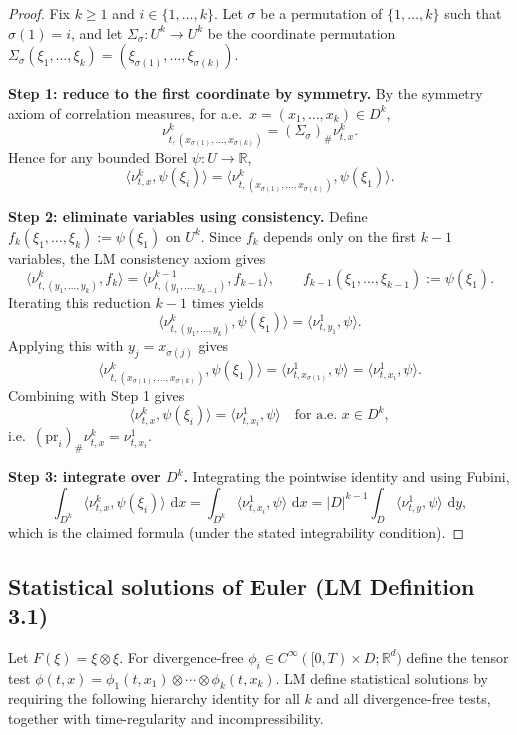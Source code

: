 \documentclass{article}
\numberwithin{equation}{section}
\theoremstyle{plain}
\theoremstyle{definition}
\theoremstyle{remark}
\newcommand{\R}{\mathbb{R}}
\newcommand{\dd}{\,\mathrm{d}}
\begin{document}
\begin{proof}
Fix $k\ge1$ and $i\in\{1,\dots,k\}$. Let $\sigma$ be a permutation of $\{1,\dots,k\}$ such that $\sigma(1)=i$,
and let $\Sigma_\sigma:U^k\to U^k$ be the coordinate permutation
$\Sigma_\sigma(\xi_1,\dots,\xi_k)=(\xi_{\sigma(1)},\dots,\xi_{\sigma(k)})$.

\smallskip
\noindent\textbf{Step 1: reduce to the first coordinate by symmetry.}
By the symmetry axiom of correlation measures, for a.e.\ $x=(x_1,\dots,x_k)\in D^k$,
\[
\nu^k_{t,(x_{\sigma(1)},\dots,x_{\sigma(k)})}=(\Sigma_\sigma)_\#\nu^k_{t,x}.
\]
Hence for any bounded Borel $\psi:U\to\R$,
\[
\langle \nu^k_{t,x},\psi(\xi_i)\rangle
=
\langle \nu^k_{t,(x_{\sigma(1)},\dots,x_{\sigma(k)})},\psi(\xi_1)\rangle.
\]

\smallskip
\noindent\textbf{Step 2: eliminate variables using consistency.}
Define $f_k(\xi_1,\dots,\xi_k):=\psi(\xi_1)$ on $U^k$.
Since $f_k$ depends only on the first $k-1$ variables, the LM consistency axiom gives
\[
\langle \nu^k_{t,(y_1,\dots,y_k)}, f_k\rangle
=
\langle \nu^{k-1}_{t,(y_1,\dots,y_{k-1})}, f_{k-1}\rangle,
\qquad
f_{k-1}(\xi_1,\dots,\xi_{k-1}):=\psi(\xi_1).
\]
Iterating this reduction $k-1$ times yields
\[
\langle \nu^k_{t,(y_1,\dots,y_k)},\psi(\xi_1)\rangle
=
\langle \nu^1_{t,y_1},\psi\rangle.
\]
Applying this with $y_j=x_{\sigma(j)}$ gives
\[
\langle \nu^k_{t,(x_{\sigma(1)},\dots,x_{\sigma(k)})},\psi(\xi_1)\rangle
=
\langle \nu^1_{t,x_{\sigma(1)}},\psi\rangle
=
\langle \nu^1_{t,x_i},\psi\rangle.
\]
Combining with Step 1 gives
\[
\langle \nu^k_{t,x},\psi(\xi_i)\rangle=\langle \nu^1_{t,x_i},\psi\rangle
\quad\text{for a.e.\ }x\in D^k,
\]
i.e.\ $(\mathrm{pr}_i)_\#\nu^k_{t,x}=\nu^1_{t,x_i}$.

\smallskip
\noindent\textbf{Step 3: integrate over $D^k$.}
Integrating the pointwise identity and using Fubini,
\[
\int_{D^k}\langle \nu^k_{t,x},\psi(\xi_i)\rangle\,\dd x
=
\int_{D^k}\langle \nu^1_{t,x_i},\psi\rangle\,\dd x
=
|D|^{k-1}\int_D\langle \nu^1_{t,y},\psi\rangle\,\dd y,
\]
which is the claimed formula (under the stated integrability condition).
\end{proof}




\subsection{Statistical solutions of Euler (LM Definition 3.1)}

Let $F(\xi)=\xi\otimes\xi$. For divergence-free $\phi_i\in C^\infty([0,T)\times D;\R^d)$ define the tensor test
$\phi(t,x)=\phi_1(t,x_1)\otimes\cdots\otimes\phi_k(t,x_k)$. LM define statistical solutions by requiring the following
hierarchy identity for all $k$ and all divergence-free tests, together with time-regularity and incompressibility.
\end{document}
